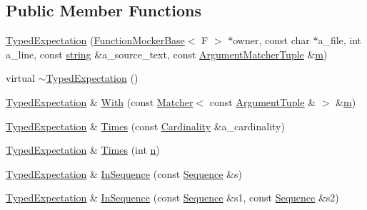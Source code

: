 \subsection*{Public Member Functions}
\begin{DoxyCompactItemize}
\item 
\hyperlink{classtesting_1_1internal_1_1TypedExpectation_a10bd0a8fa0db37215be42e1c61ccbc28}{Typed\+Expectation} (\hyperlink{classtesting_1_1internal_1_1FunctionMockerBase}{Function\+Mocker\+Base}$<$ F $>$ $\ast$owner, const char $\ast$a\+\_\+file, int a\+\_\+line, const \hyperlink{namespacetesting_1_1internal_a8e8ff5b11e64078831112677156cb111}{string} \&a\+\_\+source\+\_\+text, const \hyperlink{classtesting_1_1internal_1_1TypedExpectation_a8f10e3906761cc5c10fa3561c6e8938e}{Argument\+Matcher\+Tuple} \&\hyperlink{app_2main_8cpp_a0d2d8836216fc94b61aa0824eb239db2}{m})
\item 
virtual \hyperlink{classtesting_1_1internal_1_1TypedExpectation_a4d73d7edd81f1b1418a33931fe728158}{$\sim$\+Typed\+Expectation} ()
\item 
\hyperlink{classtesting_1_1internal_1_1TypedExpectation}{Typed\+Expectation} \& \hyperlink{classtesting_1_1internal_1_1TypedExpectation_a4b25ec3d051e8551f3e213214b31c714}{With} (const \hyperlink{classtesting_1_1Matcher}{Matcher}$<$ const \hyperlink{classtesting_1_1internal_1_1TypedExpectation_a9a91379262d101f435809ba4556d14fa}{Argument\+Tuple} \& $>$ \&\hyperlink{app_2main_8cpp_a0d2d8836216fc94b61aa0824eb239db2}{m})
\item 
\hyperlink{classtesting_1_1internal_1_1TypedExpectation}{Typed\+Expectation} \& \hyperlink{classtesting_1_1internal_1_1TypedExpectation_a9a4c34ee5c6e6adc880a22f61f33da57}{Times} (const \hyperlink{classtesting_1_1Cardinality}{Cardinality} \&a\+\_\+cardinality)
\item 
\hyperlink{classtesting_1_1internal_1_1TypedExpectation}{Typed\+Expectation} \& \hyperlink{classtesting_1_1internal_1_1TypedExpectation_a92d56ee785d38ec8193aed2a0fcbccf0}{Times} (int \hyperlink{app_2main_8cpp_acfc02ec89670db29251fda6a66602ce2}{n})
\item 
\hyperlink{classtesting_1_1internal_1_1TypedExpectation}{Typed\+Expectation} \& \hyperlink{classtesting_1_1internal_1_1TypedExpectation_ada9e9081a98435991310ac60483d1230}{In\+Sequence} (const \hyperlink{classtesting_1_1Sequence}{Sequence} \&s)
\item 
\hyperlink{classtesting_1_1internal_1_1TypedExpectation}{Typed\+Expectation} \& \hyperlink{classtesting_1_1internal_1_1TypedExpectation_ac0f45c73e3f816796f6c5dea2dc70131}{In\+Sequence} (const \hyperlink{classtesting_1_1Sequence}{Sequence} \&s1, const \hyperlink{classtesting_1_1Sequence}{Sequence} \&s2)

\end{DoxyCompactItemize}

